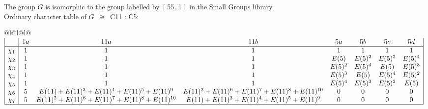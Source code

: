\documentclass[varwidth=\maxdimen,border=10]{standalone}
\begin{document}
The group $G$ is isomorphic to the group labelled by\ [ 55, 1 ]\ in the Small Groups library.\\
Ordinary character table of $G$\ $\cong$\ C11 : C5:\\
\begin{center}
\begin{tabular}{@{}l@{}l@{}l@{}}
\hline
\(\begin{array}{|l|ccccccc|}
  & 1a & 11a & 11b & 5a & 5b & 5c & 5d\\ \hline
\chi_{1} & 1 & 1 & 1 & 1 & 1 & 1 & 1\\
\chi_{2} & 1 & 1 & 1 & E(5) & E(5)^{2} & E(5)^{3} & E(5)^{4}\\
\chi_{3} & 1 & 1 & 1 & E(5)^{2} & E(5)^{4} & E(5) & E(5)^{3}\\
\chi_{4} & 1 & 1 & 1 & E(5)^{3} & E(5) & E(5)^{4} & E(5)^{2}\\
\chi_{5} & 1 & 1 & 1 & E(5)^{4} & E(5)^{3} & E(5)^{2} & E(5)\\
\chi_{6} & 5 & E(11)+E(11)^{3}+E(11)^{4}+E(11)^{5}+E(11)^{9} & E(11)^{2}+E(11)^{6}+E(11)^{7}+E(11)^{8}+E(11)^{10} & 0 & 0 & 0 & 0\\
\chi_{7} & 5 & E(11)^{2}+E(11)^{6}+E(11)^{7}+E(11)^{8}+E(11)^{10} & E(11)+E(11)^{3}+E(11)^{4}+E(11)^{5}+E(11)^{9} & 0 & 0 & 0 & 0\\
\hline
\end{array}\)\\
\end{tabular}
\end{center}
\end{document}
